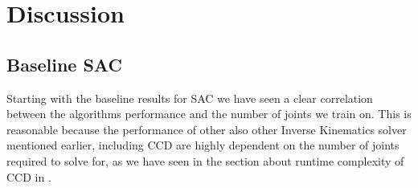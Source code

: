 \chapter{Discussion}\label{chap:discussion}

\section{Baseline SAC}

Starting with the baseline results for SAC we have seen a clear correlation between the algorithms performance and the number of joints we  train on. This is reasonable because the performance of other also other Inverse Kinematics solver mentioned earlier, including CCD are highly dependent on the number of joints required to solve for, as we have seen in the section about runtime complexity of CCD in .\\

